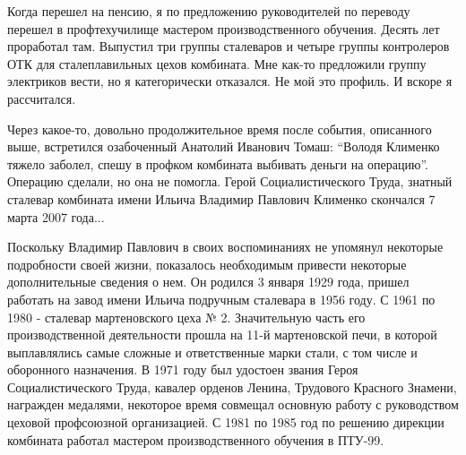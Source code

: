 Когда перешел на пенсию, я по предложению руководителей по переводу перешел в
профтехучилище мастером производственного обучения. Десять лет проработал там.
Выпустил три группы сталеваров и четыре группы контролеров ОТК для
сталеплавильных цехов комбината. Мне как-то предложили группу электриков вести,
но я категорически отказался. Не мой это профиль. И вскоре я рассчитался.

Через какое-то, довольно продолжительное время после события, описанного выше,
встретился озабоченный Анатолий Иванович Томаш: \enquote{Володя Клименко тяжело
заболел, спешу в профком комбината выбивать деньги на операцию}. Операцию
сделали, но она не помогла. Герой Социалистического Труда, знатный сталевар
комбината имени Ильича Владимир Павлович Клименко скончался 7 марта 2007 года...

Поскольку Владимир Павлович в своих воспоминаниях не упомянул некоторые
подробности своей жизни, показалось необходимым привести некоторые
дополнительные сведения о нем. Он родился 3 января 1929 года,  пришел работать
на завод имени Ильича подручным сталевара в 1956 году. С 1961 по 1980 -
сталевар мартеновского цеха № 2. Значительную часть его производственной
деятельности прошла на 11-й мартеновской печи, в которой выплавлялись самые
сложные и ответственные марки стали, с том числе и оборонного назначения. В
1971 году был удостоен звания Героя Социалистического Труда, кавалер орденов
Ленина, Трудового Красного Знамени, награжден медалями, некоторое время
совмещал основную работу с руководством цеховой профсоюзной организацией. С
1981 по 1985 год по решению  дирекции комбината работал мастером
производственного обучения в ПТУ-99.
